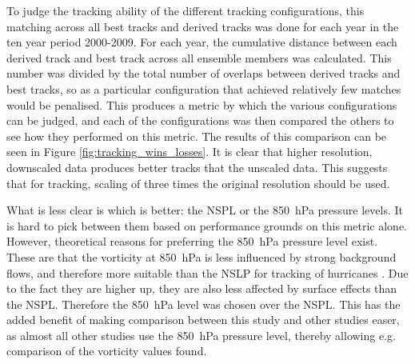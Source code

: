 \documentclass[pdftex,12pt,a4paper]{report}
\begin{document}
To judge the tracking ability of the different tracking configurations, this matching across all
best tracks and derived tracks was done for each year in the ten year period 2000-2009. For each
year, the cumulative distance between each derived track and best track across all ensemble members
was calculated. This number was divided by the total number of overlaps between derived tracks and
best tracks, so as a particular configuration that achieved relatively few matches would be
penalised. This produces a metric by which the various configurations can be judged, and each of
the configurations was then compared the others to see how they performed on this metric. The
results of this comparison can be seen in Figure \ref{fig:tracking_wins_losses}. It is clear that
higher resolution, downscaled data produces better tracks that the unscaled data. This suggests that
for tracking, scaling of three times the original resolution should be used.

What is less clear is which is better: the NSPL or the \SI{850}{hPa} pressure levels. It is hard to
pick between them based on performance grounds on this metric alone. However, theoretical reasons
for preferring the \SI{850}{hPa} pressure level exist. These are that the vorticity at \SI{850}{hPa}
is less influenced by strong background flows, and therefore more suitable than the NSLP for
tracking of hurricanes \parencite{trigo2006climatology}. Due to the fact they are higher up, they are
also less affected by surface effects than the NSPL. Therefore the \SI{850}{hPa} level was chosen
over the NSPL. This has the added benefit of making comparison between this study and other studies
easer, as almost all other studies use the \SI{850}{hPa} pressure level, thereby allowing e.g.
comparison of the vorticity values found.
\end{document}
